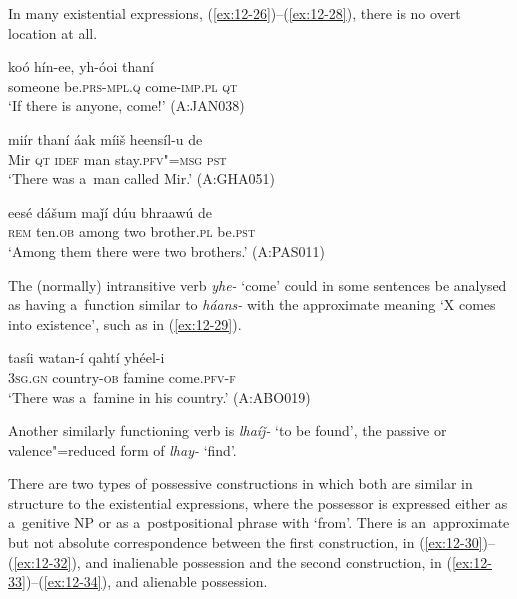 In many existential expressions, (\ref{ex:12-26})--(\ref{ex:12-28}), there is no overt location at all.

\begin{exe}
\ex
\label{ex:12-26}
\gll koó hín-ee, yh-óoi thaní \\
someone be.\textsc{prs}-\textsc{mpl.q} come-\textsc{imp.pl} \textsc{qt} \\
\glt `If there is anyone, come!' (A:JAN038)
\end{exe}
\begin{exe}
\ex
\label{ex:12-27}
\gll miír thaní áak míiš heensíl-u de \\
Mir \textsc{qt} \textsc{idef} man stay.\textsc{pfv"=msg} \textsc{pst} \\
\glt `There was a~man called Mir.' (A:GHA051)
\end{exe}
\begin{exe}
\ex
\label{ex:12-28}
\gll eesé dášum maǰí dúu bhraawú de \\
\textsc{rem} ten.\textsc{ob} among two brother.\textsc{pl} be.\textsc{pst} \\
\glt `Among them there were two brothers.' (A:PAS011)
\end{exe}

The (normally) intransitive verb \textit{yhe-} `come' could in some sentences be analysed as having a~function similar to \textit{háans-} with the approximate meaning `X comes into existence', such as in (\ref{ex:12-29}).

\begin{exe}
\ex
\label{ex:12-29}
\gll tasíi watan-í qahtí yhéel-i \\
\textsc{3sg.gn} country-\textsc{ob} famine come.\textsc{pfv-f} \\
\glt `There was a~famine in his country.' (A:ABO019)
\end{exe}

Another similarly functioning verb is \textit{lhaíǰ-} `to be found', the passive or valence"=reduced form of \textit{lhay-} `find'.


 There are two types of possessive constructions in which both are similar in structure to the existential expressions, where the possessor is expressed either as a~genitive NP or as a~postpositional phrase with `from'. There is an~approximate but not absolute correspondence between the first construction, in (\ref{ex:12-30})--(\ref{ex:12-32}), and inalienable possession and the second construction, in (\ref{ex:12-33})--(\ref{ex:12-34}), and alienable possession.

